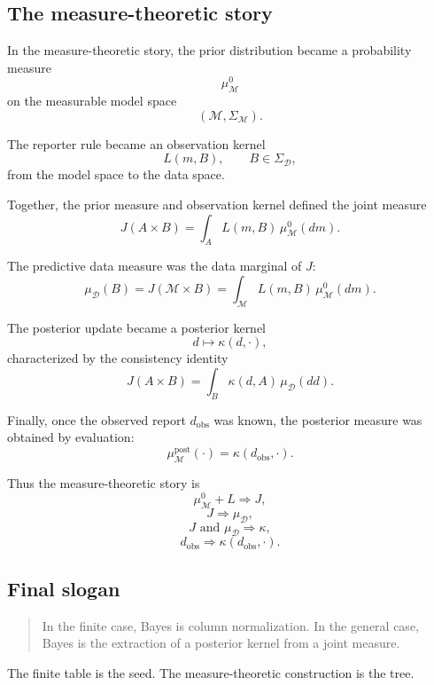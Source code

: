 \documentclass[11pt]{article}
\newcommand{\M}{\mathcal{M}}
\newcommand{\D}{\mathcal{D}}
\newcommand{\SigmaM}{\Sigma_{\M}}
\newcommand{\SigmaD}{\Sigma_{\D}}
\newcommand{\muMzero}{\mu^0_{\M}}
\newcommand{\muD}{\mu_{\D}}
\newcommand{\dobs}{d_{\mathrm{obs}}}
\begin{document}
\subsection{The measure-theoretic story}

In the measure-theoretic story, the prior distribution became a probability measure
\[
    \muMzero
\]
on the measurable model space
\[
    (\M,\SigmaM).
\]

The reporter rule became an observation kernel
\[
    L(m,B),
    \qquad
    B\in\SigmaD,
\]
from the model space to the data space.

Together, the prior measure and observation kernel defined the joint measure
\[
    J(A\times B)
    =
    \int_A L(m,B)\,\muMzero(dm).
\]

The predictive data measure was the data marginal of \(J\):
\[
    \muD(B)
    =
    J(\M\times B)
    =
    \int_{\M} L(m,B)\,\muMzero(dm).
\]

The posterior update became a posterior kernel
\[
    d\longmapsto \kappa(d,\cdot),
\]
characterized by the consistency identity
\[
    J(A\times B)
    =
    \int_B \kappa(d,A)\,\muD(dd).
\]

Finally, once the observed report \(\dobs\) was known, the posterior measure was obtained by evaluation:
\[
    \mu^{\mathrm{post}}_{\M}(\cdot)
    =
    \kappa(\dobs,\cdot).
\]

Thus the measure-theoretic story is
\[
    \muMzero
    +
    L
    \Longrightarrow
    J,
\]
\[
    J
    \Longrightarrow
    \muD,
\]
\[
    J
    \text{ and }
    \muD
    \Longrightarrow
    \kappa,
\]
\[  
    \dobs
    \Longrightarrow
    \kappa(\dobs,\cdot).
\]

\subsection{Final slogan}

\begin{quote}
    In the finite case, Bayes is column normalization. In the general case, Bayes is the extraction of a posterior kernel from a joint measure.
\end{quote}

The finite table is the seed. The measure-theoretic construction is the tree.

\appendix
\end{document}
